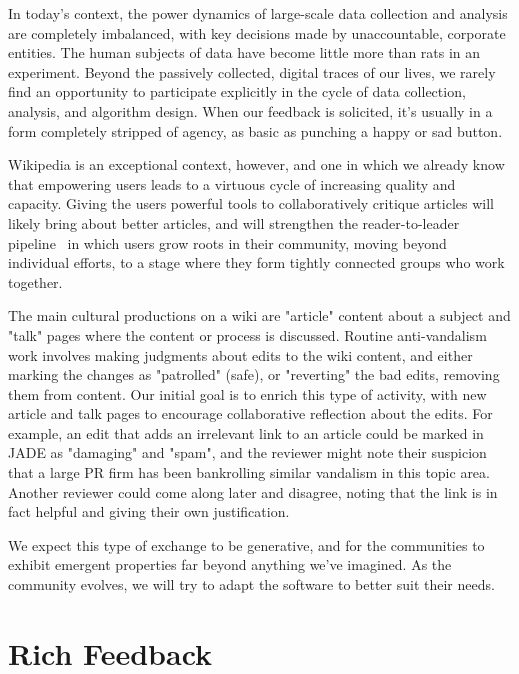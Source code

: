 \documentclass{sigchi-ext}
\begin{document}
In today's context, the power dynamics of large-scale data collection and analysis are completely imbalanced, with key decisions made by unaccountable, corporate entities.  The human subjects of data have become little more than rats in an experiment.  Beyond the passively collected, digital traces of our lives, we rarely find an opportunity to participate explicitly in the cycle of data collection, analysis, and algorithm design.  When our feedback is solicited, it's usually in a form completely stripped of agency, as basic as punching a happy or sad button.\cite{levaniemi2012indicator}

Wikipedia is an exceptional context, however, and one in which we already know that empowering users leads to a virtuous cycle of increasing quality and capacity.  Giving the users powerful tools to collaboratively critique articles will likely bring about better articles, and will strengthen the reader-to-leader pipeline~\cite{preece2009reader} in which users grow roots in their community, moving beyond individual efforts, to a stage where they form tightly connected groups who work together.

The main cultural productions on a wiki are "article" content about a subject and "talk" pages where the content or process is discussed.  Routine anti-vandalism work involves making judgments about edits to the wiki content, and either marking the changes as "patrolled" (safe), or "reverting" the bad edits, removing them from content.  Our initial goal is to enrich this type of activity, with new article and talk pages to encourage collaborative reflection about the edits.  For example, an edit that adds an irrelevant link to an article could be marked in JADE as "damaging" and "spam", and the reviewer might note their suspicion that a large PR firm has been bankrolling similar vandalism in this topic area.  Another reviewer could come along later and disagree, noting that the link is in fact helpful and giving their own justification.

We expect this type of exchange to be generative, and for the communities to exhibit emergent properties far beyond anything we've imagined.  As the community evolves, we will try to adapt the software to better suit their needs.

\section{Rich Feedback}
\end{document}
